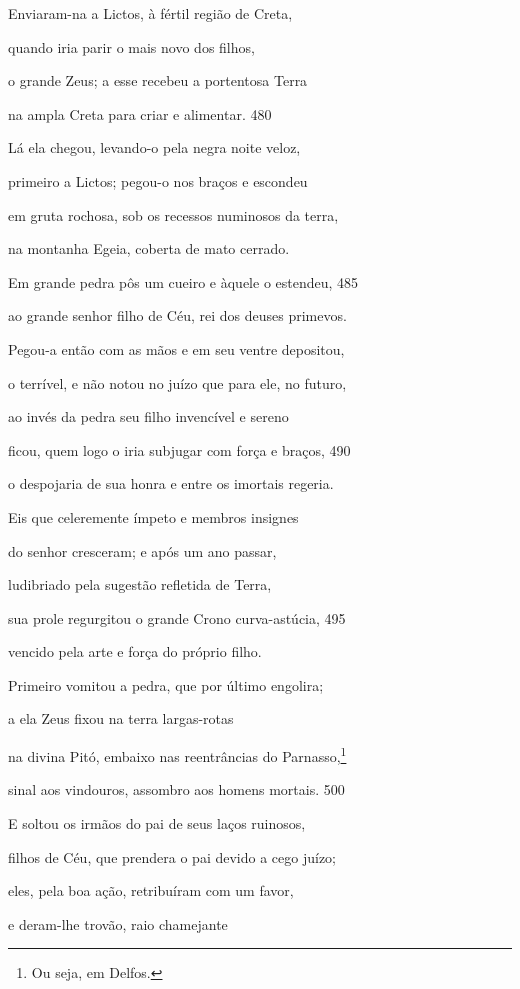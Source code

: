 Enviaram-na a Lictos, à fértil região de Creta,

quando iria parir o mais novo dos filhos,

o grande Zeus; a esse recebeu a portentosa Terra

na ampla Creta para criar e alimentar. \num{480}

Lá ela chegou, levando-o pela negra noite veloz,

primeiro a Lictos; pegou-o nos braços e escondeu

em gruta rochosa, sob os recessos numinosos da terra,

na montanha Egeia, coberta de mato cerrado.

Em grande pedra pôs um cueiro e àquele o estendeu, \num{485}

ao grande senhor filho de Céu, rei dos deuses primevos.

Pegou-a então com as mãos e em seu ventre depositou,

o terrível, e não notou no juízo que para ele, no futuro,

ao invés da pedra seu filho invencível e sereno

ficou, quem logo o iria subjugar com força e braços, \num{490}

o despojaria de sua honra e entre os imortais regeria.

\quad{}Eis que celeremente ímpeto e membros insignes

do senhor cresceram; e após um ano passar,

ludibriado pela sugestão refletida de Terra,

sua prole regurgitou o grande Crono curva-astúcia, \num{495}

vencido pela arte e força do próprio filho.

Primeiro vomitou a pedra, que por último engolira;

a ela Zeus fixou na terra largas-rotas

na divina Pitó, embaixo nas reentrâncias do Parnasso,\footnote{Ou seja, em Delfos.}

sinal aos vindouros, assombro aos homens mortais. \num{500}

\quad{}E soltou os irmãos do pai de seus laços ruinosos,

filhos de Céu, que prendera o pai devido a cego juízo;

eles, pela boa ação, retribuíram com um favor,

e deram-lhe trovão, raio chamejante

